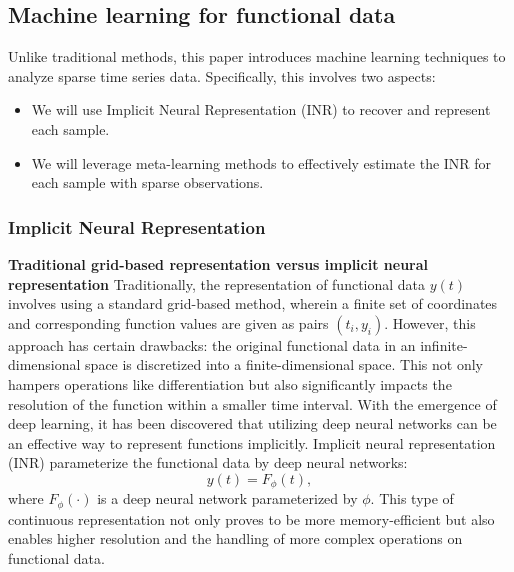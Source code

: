 \documentclass{article}
\begin{document}
\subsection{Machine learning for functional data}
Unlike traditional methods, this paper introduces machine learning techniques to analyze sparse time series data. 
Specifically, this involves two aspects:
\begin{itemize}
  \item We will use Implicit Neural Representation (INR) \cite{sitzmann2020implicit} to recover and represent each sample.
  \item We will leverage meta-learning methods to effectively estimate the INR for each sample with sparse observations.
\end{itemize}

\subsubsection{Implicit Neural Representation}

\textbf{Traditional grid-based representation versus implicit neural representation}
Traditionally, the representation of functional data $y(t)$ involves using a standard grid-based method, 
wherein a finite set of coordinates and corresponding function values are given as pairs $(t_i, y_i)$. 
However, this approach has certain drawbacks: the original functional data in an infinite-dimensional space is discretized into a finite-dimensional space. 
This not only hampers operations like differentiation but also significantly impacts the resolution of the function within a smaller time interval.
With the emergence of deep learning, it has been discovered that utilizing deep neural networks can be an effective way to represent functions implicitly.
Implicit neural representation (INR) parameterize the functional data by deep neural networks:
$$y(t)=F_\phi(t), $$
where $F_\phi(\cdot)$ is a deep neural network parameterized by $\phi$.
This type of continuous representation not only proves to be more memory-efficient but also enables higher resolution and the handling of more complex operations on functional data.
\end{document}
